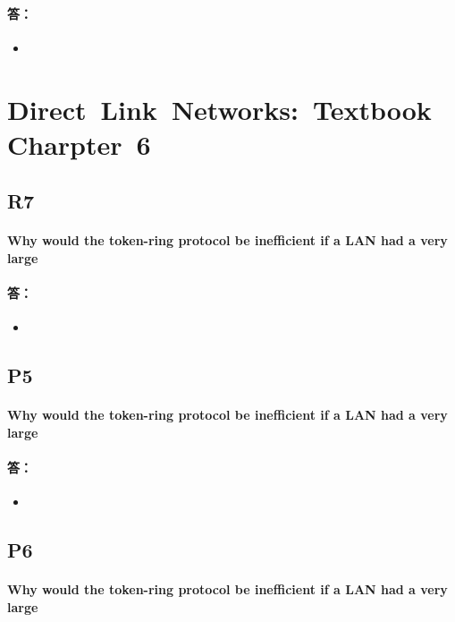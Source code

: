 \documentclass[a4paper]{ctexart}
\begin{document}
\paragraph*{答：} 
\begin{itemize}
    \item 
\end{itemize}

\section*{Direct\ Link\ Networks:\ Textbook\ Charpter\ 6}
\subsection*{R7}
\paragraph*{Why would the token-ring protocol be inefficient if a LAN had a very large\\}
\paragraph*{答：} 
\begin{itemize}
    \item 
\end{itemize}

\subsection*{P5}
\paragraph*{Why would the token-ring protocol be inefficient if a LAN had a very large\\}
\paragraph*{答：} 
\begin{itemize}
    \item 
\end{itemize}

\subsection*{P6}
\paragraph*{Why would the token-ring protocol be inefficient if a LAN had a very large\\}
\end{document}

